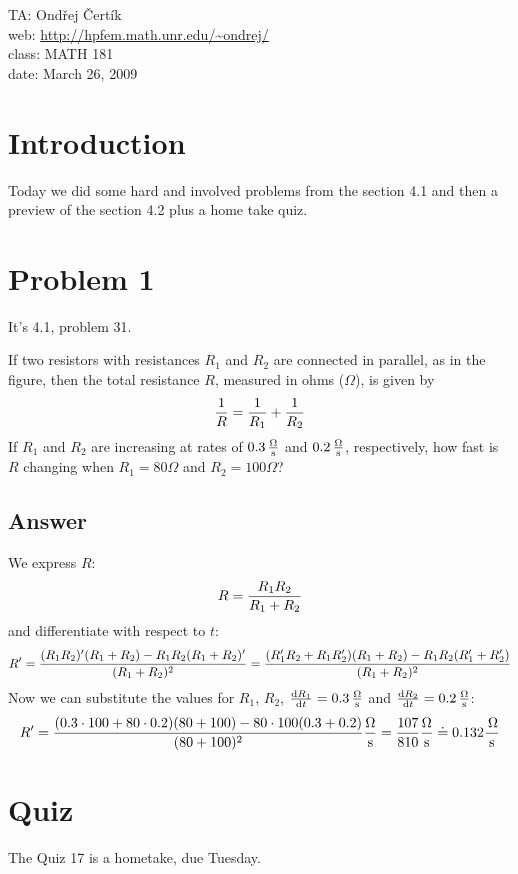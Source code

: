 \documentclass[10pt]{article}
\begin{document}
\noindent TA: Ondřej Čertík\\
web: \url{http://hpfem.math.unr.edu/~ondrej/}\\
class: MATH 181\\
date: March 26, 2009

\section{Introduction}

Today we did some hard and involved problems from the section 4.1 and then a
preview of the section 4.2 plus a home take quiz.

\section{Problem 1}

It's 4.1, problem 31.

If two resistors with resistances $R_1$ and $R_2$ are connected in parallel, as
in the figure, then the total resistance $R$, measured in ohms ($\Omega$), is
given by
$$
{1\over R} = {1\over R_1} + {1\over R_2}
$$
If $R_1$ and $R_2$ are increasing at rates of
$0.3\rm\,{\Omega\over s}$
and
$0.2\rm\,{\Omega\over s}$,
respectively, how fast is $R$ changing when $R_1=80\Omega$ and $R_2=100\Omega$?

\subsection*{Answer}

We express $R$:
$$R = {R_1R_2\over R_1+R_2}$$
and differentiate with respect to $t$:
$$R' =
{(R_1R_2)'(R_1+R_2) - R_1R_2(R_1+R_2)'\over (R_1+R_2)^2}=
{(R_1'R_2+R_1R_2')(R_1+R_2) - R_1R_2(R_1'+R_2')\over (R_1+R_2)^2}
$$
Now we can substitute the values for $R_1$, $R_2$,
${{\rm d} R_1\over {\rm d} t}=0.3\rm\,{\Omega\over s}$
and
${{\rm d} R_2\over {\rm d} t}=0.2\rm\,{\Omega\over s}$:
$$R'=
{(0.3\cdot 100+80\cdot0.2)(80+100) - 80\cdot100(0.3+0.2)\over (80+100)^2}
{\rm\Omega\over s}
=
{107\over810}
{\rm\Omega\over s}
\doteq
0.132
{\rm\,\Omega\over s}
$$
\section{Quiz}

The Quiz 17 is a hometake, due Tuesday.
\end{document}
